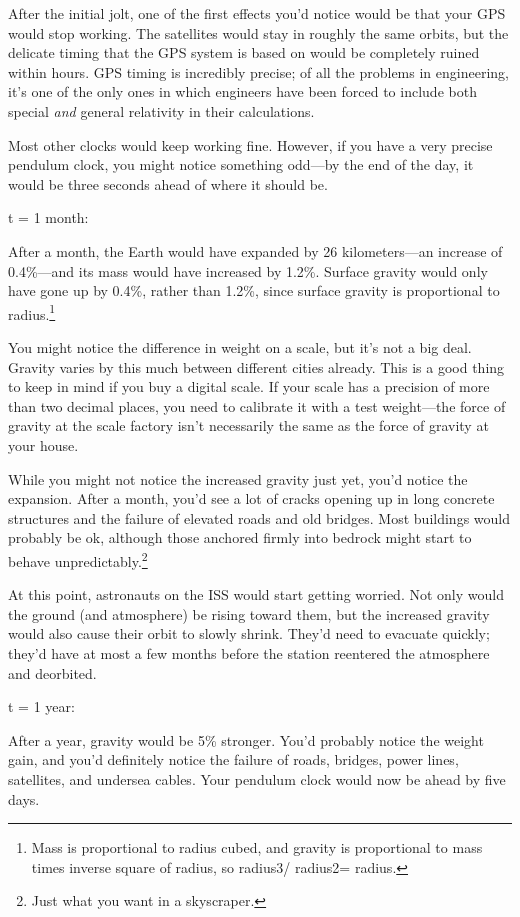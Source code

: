 {{After the initial jolt, one of the first effects you'd notice would be that your GPS would stop working. The satellites would stay in roughly the same orbits, but the delicate timing that the GPS system is based on would be completely ruined within hours. GPS timing is incredibly precise; of all the problems in engineering, it's one of the only ones in which engineers have been forced to include both special \emph{and} general relativity in their calculations.}

{Most other clocks would keep working fine. However, if you have a very precise pendulum clock, you might notice something odd—by the end of the day, it would be three seconds ahead of where it should be.}

{t = 1 month:}

{After a month, the Earth would have expanded by 26 kilometers—an increase of 0.4\%—and its mass would have increased by 1.2\%. Surface gravity would only have gone up by 0.4\%, rather than 1.2\%, since surface gravity is proportional to radius.{\footnote{Mass is proportional to radius cubed, and gravity is proportional to mass times inverse square of radius, so radius3/ radius2= radius.} } }

{You might notice the difference in weight on a scale, but it's not a big deal. Gravity varies by this much between different cities already. This is a good thing to keep in mind if you buy a digital scale. If your scale has a precision of more than two decimal places, you need to calibrate it with a test weight—the force of gravity at the scale factory isn't necessarily the same as the force of gravity at your house.}

{While you might not notice the increased gravity just yet, you'd notice the expansion. After a month, you'd see a lot of cracks opening up in long concrete structures and the failure of elevated roads and old bridges. Most buildings would probably be ok, although those anchored firmly into bedrock might start to behave unpredictably.{\footnote{Just what you want in a skyscraper.} } }

{At this point, astronauts on the ISS would start getting worried. Not only would the ground (and atmosphere) be rising toward them, but the increased gravity would also cause their orbit to slowly shrink. They'd need to evacuate quickly; they'd have at most a few months before the station reentered the atmosphere and deorbited.}

{t = 1 year:}

{After a year, gravity would be 5\% stronger. You'd probably notice the weight gain, and you'd definitely notice the failure of roads, bridges, power lines, satellites, and undersea cables. Your pendulum clock would now be ahead by five days.}

}
